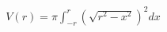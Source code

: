 \documentclass[preview]{standalone}
\begin{document}
\begin{align*}
V\left(r\right)=\pi\int_{-r}^{r}\left(\sqrt{r^{2}-x^{2}}\right)^{2}dx
\end{align*}
\end{document}
